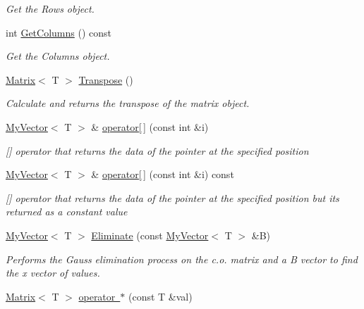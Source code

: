 \begin{DoxyCompactItemize}
\begin{DoxyCompactList}\small\item\em Get the Rows object. \end{DoxyCompactList}\item 
int \mbox{\hyperlink{class_matrix_ada60917bb197292e0645992e108c2c2f}{Get\+Columns}} () const
\begin{DoxyCompactList}\small\item\em Get the Columns object. \end{DoxyCompactList}\item 
\mbox{\hyperlink{class_matrix}{Matrix}}$<$ T $>$ \mbox{\hyperlink{class_matrix_a86d55a5db43b641f4e8fb2b302ccc599}{Transpose}} ()
\begin{DoxyCompactList}\small\item\em Calculate and returns the transpose of the matrix object. \end{DoxyCompactList}\item 
\mbox{\hyperlink{class_my_vector}{My\+Vector}}$<$ T $>$ \& \mbox{\hyperlink{class_matrix_aa9532c87a69bef256954e2309ca3fdd6}{operator\mbox{[}$\,$\mbox{]}}} (const int \&i)
\begin{DoxyCompactList}\small\item\em \mbox{[}\mbox{]} operator that returns the data of the pointer at the specified position \end{DoxyCompactList}\item 
\mbox{\hyperlink{class_my_vector}{My\+Vector}}$<$ T $>$ \& \mbox{\hyperlink{class_matrix_a56c7f18f272e74bee2b616eba702fc87}{operator\mbox{[}$\,$\mbox{]}}} (const int \&i) const
\begin{DoxyCompactList}\small\item\em \mbox{[}\mbox{]} operator that returns the data of the pointer at the specified position but its returned as a constant value \end{DoxyCompactList}\item 
\mbox{\hyperlink{class_my_vector}{My\+Vector}}$<$ T $>$ \mbox{\hyperlink{class_matrix_a427a50c20bb056fd20bdf2740995f8c1}{Eliminate}} (const \mbox{\hyperlink{class_my_vector}{My\+Vector}}$<$ T $>$ \&B)
\begin{DoxyCompactList}\small\item\em Performs the Gauss elimination process on the c.\+o. matrix and a B vector to find the x vector of values. \end{DoxyCompactList}\item 
\mbox{\hyperlink{class_matrix}{Matrix}}$<$ T $>$ \mbox{\hyperlink{class_matrix_a7754aef3ca206db6fb054088ba90409f}{operator $\ast$}} (const T \&val)

\end{DoxyCompactItemize}
